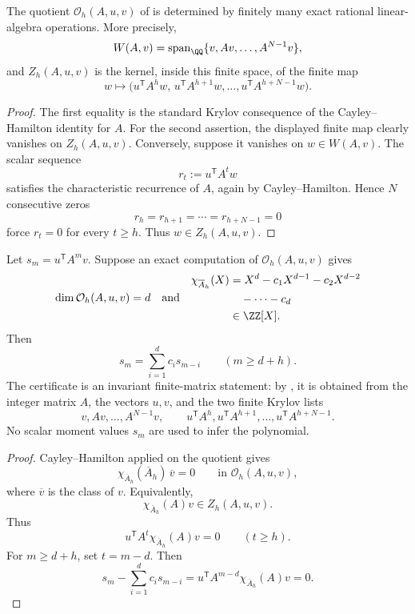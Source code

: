 \begin{lemma}
\label{lem:cayley-hamilton-recurrence-certificate}
The quotient \(\mathcal O_h(A,u,v)\) of
 is determined by finitely many exact rational
linear-algebra operations.  More precisely,
\[
  W(A,v)=
  \operatorname{span}_{\QQ}\{v,Av,\dots,A^{N-1}v\},
\]
and \(Z_h(A,u,v)\) is the kernel, inside this finite space, of the finite map
\[
  w\longmapsto
  \bigl(u^{\mathsf T}A^h w,\,
        u^{\mathsf T}A^{h+1} w,\dots,
        u^{\mathsf T}A^{h+N-1}w\bigr).
\]
\end{lemma}

\begin{proof}
The first equality is the standard Krylov consequence of the
Cayley--Hamilton identity for \(A\).  For the second assertion, the displayed
finite map clearly vanishes on \(Z_h(A,u,v)\).  Conversely, suppose it vanishes
on \(w\in W(A,v)\).  The scalar sequence
\[
  r_t:=u^{\mathsf T}A^t w
\]
satisfies the characteristic recurrence of \(A\), again by
Cayley--Hamilton.  Hence \(N\) consecutive zeros
\[
  r_h=r_{h+1}=\cdots=r_{h+N-1}=0
\]
force \(r_t=0\) for every \(t\ge h\).  Thus \(w\in Z_h(A,u,v)\).
\end{proof}

\begin{lemma}
\label{lem:kernel-recurrence-certificate}
Let \(s_m=u^{\mathsf T}A^m v\).  Suppose an exact computation of
\(\mathcal O_h(A,u,v)\) gives
\[
  \dim\mathcal O_h(A,u,v)=d
  \quad\text{and}\quad
  \begin{aligned}
  \chi_{\overline A_h}(X)
  &=
  X^d-c_1X^{d-1}-c_2X^{d-2} \\
  &\quad{}-\cdots-c_d \\
  &\in\ZZ[X].
  \end{aligned}
\]
Then
\[
  s_m=\sum_{i=1}^d c_i s_{m-i}
  \qquad(m\ge d+h).
\]
The certificate is an invariant finite-matrix statement: by
, it is obtained from the
integer matrix \(A\), the vectors \(u,v\), and the two finite Krylov lists
\[
  v,Av,\dots,A^{N-1}v,
  \qquad
  u^{\mathsf T}A^h,u^{\mathsf T}A^{h+1},\dots,u^{\mathsf T}A^{h+N-1}.
\]
No scalar moment values \(s_m\) are used to infer the polynomial.
\end{lemma}

\begin{proof}
Cayley--Hamilton applied on the quotient gives
\[
  \chi_{\overline A_h}(\overline A_h)\,\overline v=0
  \qquad\text{in }\mathcal O_h(A,u,v),
\]
where \(\overline v\) is the class of \(v\).  Equivalently,
\[
  \chi_{\overline A_h}(A)v\in Z_h(A,u,v).
\]
Thus
\[
  u^{\mathsf T}A^t\chi_{\overline A_h}(A)v=0
  \qquad(t\ge h).
\]
For \(m\ge d+h\), set \(t=m-d\).  Then
\[
  s_m-\sum_{i=1}^d c_i s_{m-i}
  =
  u^{\mathsf T}A^{m-d}\chi_{\overline A_h}(A)v
  =
  0.
\]
\end{proof}

